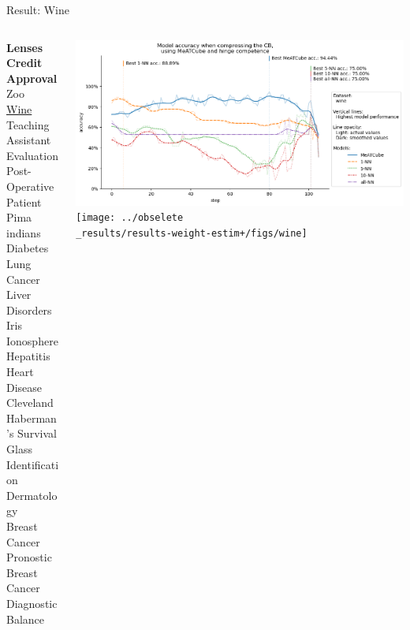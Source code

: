 \documentclass[]{beamer}
\begin{document}
\begin{frame}{Result: Wine}
    \begin{columns}
        \begin{column}{.3\textwidth}
            {\smaller\smaller\smaller
            \textbf{Lenses} \\
            \textbf{Credit Approval} \\
            Zoo \\
            \underline{Wine} \\
            Teaching Assistant Evaluation \\
            Post-Operative Patient \\
            Pima indians Diabetes \\
            Lung Cancer \\
            Liver Disorders \\
            Iris \\
            Ionosphere \\
            Hepatitis \\
            Heart Disease Cleveland \\
            Haberman's Survival \\
            Glass Identification \\
            Dermatology \\
            Breast Cancer Pronostic \\
            Breast Cancer Diagnostic \\
            Balance\\
            ~}
        \end{column}
        \begin{column}{.7\textwidth}
            \includegraphics[width=\textwidth]{../results-no-sim-tuning+/figs/wine}
            \texttt{[image: ../obselete\\\_results/results-weight-estim+/figs/wine]}
        \end{column}
    \end{columns}
\end{frame}
\end{document}
